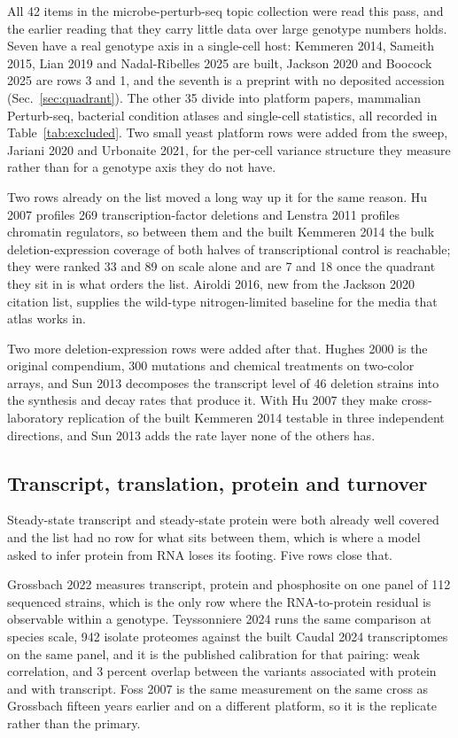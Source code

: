 All 42 items in the microbe-perturb-seq topic collection were read this pass, and the
earlier reading that they carry little data over large genotype numbers holds. Seven have a
real genotype axis in a single-cell host: Kemmeren 2014, Sameith 2015, Lian 2019 and
Nadal-Ribelles 2025 are built, Jackson 2020 and Boocock 2025 are rows 3 and 1, and the
seventh is a preprint with no deposited accession (Sec.~\ref{sec:quadrant}). The other 35
divide into platform papers, mammalian Perturb-seq, bacterial condition atlases and
single-cell statistics, all recorded in Table~\ref{tab:excluded}. Two small yeast platform
rows were added from the sweep, Jariani 2020 and Urbonaite 2021, for the per-cell variance
structure they measure rather than for a genotype axis they do not have.

Two rows already on the list moved a long way up it for the same reason. Hu 2007 profiles
269 transcription-factor deletions and Lenstra 2011 profiles chromatin regulators, so
between them and the built Kemmeren 2014 the bulk deletion-expression coverage of both
halves of transcriptional control is reachable; they were ranked 33 and 89 on scale alone
and are 7 and 18 once the quadrant they sit in is what orders the list. Airoldi 2016, new
from the Jackson 2020 citation list, supplies the wild-type nitrogen-limited baseline for
the media that atlas works in.

Two more deletion-expression rows were added after that. Hughes 2000 is the original
compendium, 300 mutations and chemical treatments on two-color arrays, and Sun 2013
decomposes the transcript level of 46 deletion strains into the synthesis and decay rates
that produce it. With Hu 2007 they make cross-laboratory replication of the built
Kemmeren 2014 testable in three independent directions, and Sun 2013 adds the rate layer
none of the others has.

\subsection{Transcript, translation, protein and turnover}

Steady-state transcript and steady-state protein were both already well covered and the
list had no row for what sits between them, which is where a model asked to infer protein
from RNA loses its footing. Five rows close that.

Grossbach 2022 measures transcript, protein and phosphosite on one panel of 112 sequenced
strains, which is the only row where the RNA-to-protein residual is observable within a
genotype. Teyssonniere 2024 runs the same comparison at species scale, 942 isolate
proteomes against the built Caudal 2024 transcriptomes on the same panel, and it is the
published calibration for that pairing: weak correlation, and 3 percent overlap between the
variants associated with protein and with transcript. Foss 2007 is the same measurement on
the same cross as Grossbach fifteen years earlier and on a different platform, so it is the
replicate rather than the primary.

